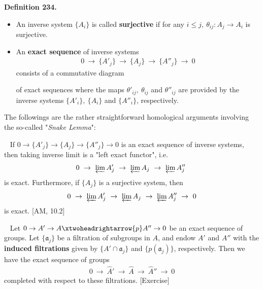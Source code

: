 \documentclass[12pt,a4paper,footinclude=true,headinclude=true]{scrbook} %
\newenvironment{proposition}[2][]
{\renewcommand\theinnercustomprop{#2}\innercustomprop[#1] 
\begin{mdframed}[backgroundcolor=gray!20]\ }
{\end{mdframed}\endinnercustomprop}
\newenvironment{corollary}[2][]
{\renewcommand\theinnercustomcol{#2}\innercustomcol[#1]
\begin{mdframed}[backgroundcolor=gray!20]\ }
{\end{mdframed}\endinnercustomcol}
\newenvironment{definition}[2][Definition]
    { \begin{mdframed}[backgroundcolor=gray!20] \textbf{#1 #2.}\ }
    {  \end{mdframed}}
\begin{document}
\begin{definition}{234}
    \begin{itemize}
        \item An inverse system $\{A_i\}$ is called \textbf{surjective} if for any $i\leq j,\ \theta_{ij}:A_j\to A_i$ is surjective.
        \item An \textbf{exact sequence} of inverse systems
        \begin{align*}
            0\ \to\ \{A'_j\}\ \to\ \{A_j\}\ \to\ \{A''_j\}\ \to\ 0
        \end{align*}
        consists of a commutative diagram
        \begin{center}
    \end{center}
    of exact sequences where the maps $\theta'_{ij},\ \theta_{ij}$ and $\theta''_{ij}$ are provided by the inverse systems $\{A'_i\},\ \{A_i\}$ and $\{A''_i\}$, respectively.
    \end{itemize}
\end{definition}

The followings are the rather straightforward homological arguments involving the so-called "\textit{Snake Lemma}":
\begin{proposition}{235}
    If $0\to\{A'_j\}\to\{A_j\}\to\{A''_j\}\to0$ is an exact sequence of inverse systems, then taking inverse limit is a "left exact functor", i.e.
    \begin{align*}
        0\ \to\ \varprojlim A'_j\ \to\ \varprojlim A_j\ \to\ \varprojlim A''_j\
    \end{align*}
    is exact. Furthermore, if $\{A_j\}$ is a surjective system, then
    \begin{align*}
        0\ \to\ \varprojlim A'_j\ \to\ \varprojlim A_j\ \to\ \varprojlim A''_j\ \to\ 0
    \end{align*}
    is exact. [AM, 10.2]
\end{proposition}

\begin{corollary}{236}
    Let $0\to A'\to A\xtwoheadrightarrow{p} A''\to0$ be an exact sequence of groups. Let $\{\mathfrak{a}_j\}$ be a filtration of subgroups in $A$, and endow $A'$ and $A''$ with the \textbf{induced filtrations} given by $\{A'\cap\mathfrak{a}_j\}$ and $\{p(\mathfrak{a}_j)\}$, respectively. Then we have the exact sequence of groups
     \begin{align*}
        0\ \to\ \widehat{A}'\ \to\ \widehat{A}\ \to\ \widehat{A}''\ \to\ 0
    \end{align*}
    completed with respect to these filtrations. [Exercise]
\end{corollary}
\end{document}
